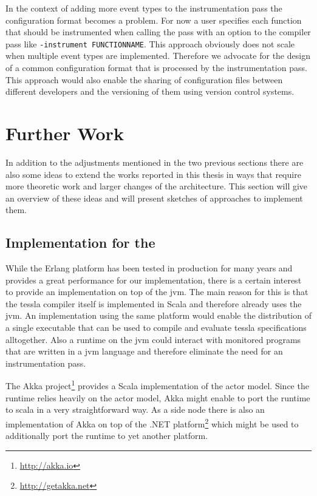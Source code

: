 In the context of adding more event types to the instrumentation pass the configuration format becomes a problem.
For now a user specifies each function that should be instrumented when calling the pass with an option to the compiler pass like \lstinline{-instrument FUNCTIONNAME}.
This approach obviously does not scale when multiple event types are implemented.
Therefore we advocate for the design of a common configuration format that is processed by the instrumentation pass.
This approach would also enable the sharing of configuration files between different developers and the versioning of them using version control systems.

\section{Further Work}
\label{sec:conclusion:further_work}

In addition to the adjustments mentioned in the two previous sections there are also some ideas to extend the works reported in this thesis in ways that require more theoretic work and larger changes of the architecture.
This section will give an overview of these ideas and will present sketches of approaches to implement them.

\subsection{Implementation for the }
\label{sec:conclusion:further_work:jvm}

While the Erlang platform has been tested in production for many years and provides a great performance for our implementation, there is a certain interest to provide an implementation on top of the \gls{jvm}.
The main reason for this is that the \gls{tessla} compiler itself is implemented in Scala and therefore already uses the \gls{jvm}.
An implementation using the same platform would enable the distribution of a single executable that can be used to compile and evaluate \gls{tessla} specifications alltogether.
Also a runtime on the \gls{jvm} could interact with monitored programs that are written in a \gls{jvm} language and therefore eliminate the need for an instrumentation pass.

The Akka project\footnote{\url{http://akka.io}} provides a Scala implementation of the actor model.
Since the runtime relies heavily on the actor model, Akka might enable to port the runtime to scala in a very straightforward way.
As a side node there is also an implementation of Akka on top of the .NET platform\footnote{\url{http://getakka.net}} which might be used to additionally port the runtime to yet another platform.

